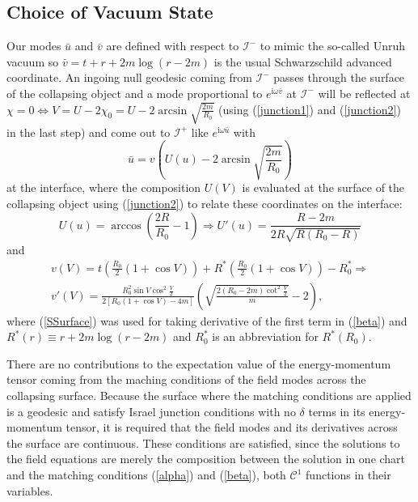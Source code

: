 \documentclass[reprint,amsmath,amssymb,aps,nofootinbib]{revtex4-1}
\newcommand{\ui}{\mathrm{i}}
\begin{document}
\subsection{Choice of Vacuum State}
Our modes $\bar u$ and $\bar v$ are defined with respect to $\mathscr I^-$ to mimic the so-called Unruh vacuum so $\bar v=t+r+2m\log(r-2m)$ is the usual Schwarzschild advanced coordinate. An ingoing null geodesic coming from $\mathscr I^-$ passes through the surface of the collapsing object and a mode proportional to $e^{\ui\omega\bar v}$ at $\mathscr I^-$ will be reflected at $\chi=0\iff V=U-2\chi_0=U-2\arcsin\sqrt{\frac{2m}{R_0}}$ (using (\ref{junction1}) and (\ref{junction2}) in the last step) and come out to $\mathscr I^+$ like $e^{\ui\omega\bar u}$ with 
\begin{equation}
\bar u=v\left(U(u)-2\arcsin\sqrt{\frac{2m}{R_0}}\right)
\label{ubar}
\end{equation}
at the interface, where the composition $U(V)$ is evaluated at the surface of the collapsing object using (\ref{junction2}) to relate these coordinates on the interface:
\begin{equation}
U(u)=\arccos\left(\frac{2R}{R_0}-1\right)\Rightarrow U'(u)=\frac{R-2m}{2R\sqrt{R(R_0-R)}}
 \label{alpha}
\end{equation}
and
\begin{multline}
v(V)=t\left(\frac{R_0}{2}(1+\cos V)\right)+R^*\left(\frac{R_0}{2}(1+\cos V)\right)-R_0^*\Rightarrow \\
v'(V)=\frac{R_0^2\sin V\cos^2\frac{V}{2}}{2[R_0(1+\cos V)-4m]}\left(\sqrt{\frac{2(R_0-2m)\cot^2\frac{V}{2}}{m}}-2\right),
 \label{beta}
\end{multline}
where (\ref{SSurface}) was used for taking derivative of the first term in (\ref{beta}) and $R^*(r)\equiv r+2m\log(r-2m)$ and $R_0^*$ is an abbreviation for $R^*(R_0)$.

There are no contributions to the expectation value of the energy-momentum tensor coming from the maching conditions of the field modes across the collapsing surface. Because the surface where the matching conditions are applied is a geodesic and satisfy Israel junction conditions with no $\delta$ terms in its energy-momentum tensor, it is required that the field modes and its derivatives across the surface are continuous\cite{rc2}. These conditions are satisfied, since the solutions to the field equations are merely the composition between the solution in one chart and the matching conditions (\ref{alpha}) and (\ref{beta}), both $\mathscr C^1$ functions in their variables.
\end{document}
